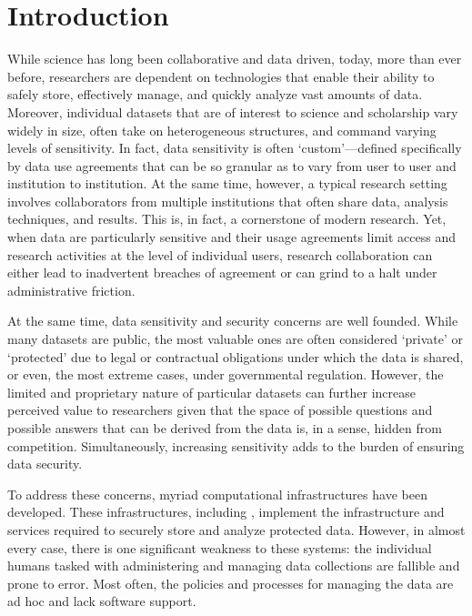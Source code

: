 \section{Introduction}



While science has long been collaborative and data driven, today, more than ever before,
researchers are dependent on technologies that enable their ability to safely store,
effectively manage, and quickly analyze vast amounts of
data. Moreover, individual datasets that are of interest to science and scholarship
vary widely in size, often take on heterogeneous structures, and command varying
levels of sensitivity. In fact, data sensitivity is often `custom'---defined specifically by
data use agreements that can be so granular as to vary from user to user and institution
to institution. At the same time, however, a typical research setting involves
collaborators from multiple institutions that often share data, analysis techniques,
and results. This is, in fact, a cornerstone of modern research. Yet, when data are
particularly sensitive and their usage agreements limit access and research activities at the
level of individual users, research collaboration can either lead to inadvertent
breaches of agreement or can grind to a halt under administrative friction.


At the same time, data sensitivity and security concerns are well founded. While many datasets are public, the most
valuable ones are often considered `private' or `protected' due to legal or contractual obligations under which the data
is shared, or even, the most extreme cases, under governmental regulation. However, the limited and proprietary nature
of particular datasets can further increase perceived value to researchers given that the space of possible
questions and possible answers that can be derived from the data is, in a sense, hidden from competition.
Simultaneously, increasing sensitivity adds to the burden of ensuring data security.


To address these concerns, myriad computational infrastructures
have been developed. These infrastructures, including \NAME \cite{babuji2016cloud},
implement the infrastructure and services required to securely store and analyze protected
data. However, in almost every case, there is one significant weakness to these systems: the individual humans tasked with administering and managing
data collections are fallible and prone to error. Most often, the policies and processes for managing
the data are ad hoc and lack software support.

